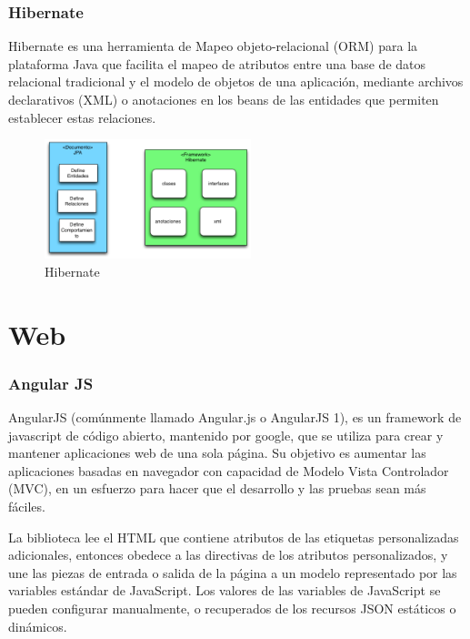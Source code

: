 \documentclass[12pt, a4paper, twoside]{book}
\begin{document}
	\subsubsection{Hibernate}	
	Hibernate es una herramienta de Mapeo objeto-relacional (ORM) para la
	plataforma Java que facilita el mapeo de atributos entre una base de datos
	relacional tradicional y el modelo de objetos de una aplicación, mediante archivos
	declarativos (XML) o anotaciones en los beans de las entidades que permiten
	establecer estas relaciones.\\
	\begin{center}
		\begin{figure}[H]
			\centering
			\includegraphics[width=6cm]{Imagenes/hibernate.png}
			\caption{Hibernate}\label{hibernate}
		\end{figure}
	\end{center}	
	\section{Web}
	\subsubsection{Angular JS}
	AngularJS (comúnmente llamado Angular.js o AngularJS 1), es un framework de javascript de código abierto, mantenido por google, que se utiliza para crear y mantener aplicaciones web de una sola página. Su objetivo es aumentar las aplicaciones basadas en navegador con capacidad de Modelo Vista Controlador (MVC), en un esfuerzo para hacer que el desarrollo y las pruebas sean más fáciles.
	
	La biblioteca lee el HTML que contiene atributos de las etiquetas personalizadas adicionales, entonces obedece a las directivas de los atributos personalizados, y une las piezas de entrada o salida de la página a un modelo representado por las variables estándar de JavaScript. Los valores de las variables de JavaScript se pueden configurar manualmente, o recuperados de los recursos JSON estáticos o dinámicos.
	
\end{document}
